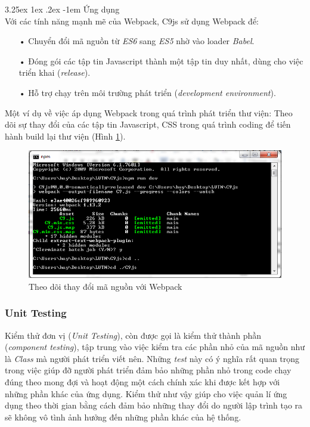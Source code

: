 \documentclass[12pt,a4paper,twoside]{article}
\makeatletter
\newcommand{\myparagraph}[1]{\paragraph{#1}\mbox{}\\} %
\renewcommand\paragraph{\@startsection{paragraph}{5}{\z@}%
  {3.25ex \@plus1ex \@minus.2ex}%
  {-1em}%
  {\normalfont\normalsize\bfseries}}
\makeatother
\begin{document}
\myparagraph{Ứng dụng}
Với các tính năng mạnh mẽ của Webpack, C9js sử dụng Webpack để:
\begin{itemize}
\item[•] Chuyển đổi mã nguồn từ \textit{ES6} sang \textit{ES5} nhờ vào loader \textit{Babel}.
\item[•] Đóng gói các tập tin Javascript thành một tập tin duy nhất, dùng cho việc triển khai (\textit{release}).
\item[•] Hỗ trợ chạy trên môi trường phát triển (\textit{development environment}).
\end{itemize}

Một ví dụ về việc áp dụng Webpack trong quá trình phát triển thư viện: Theo dõi sự thay đổi của các tập tin Javascript, CSS trong quá trình coding để tiến hành build lại thư viện (Hình \ref{fig:webpack_build}).

\begin{figure}[!h]
	\begin{center}
    \includegraphics[scale=.8]{image/webpack_build}
    \caption{Theo dõi thay đổi mã nguồn với Webpack}
    \label{fig:webpack_build}
	\end{center}
\end{figure}

\subsubsection{Unit Testing}
Kiểm thử đơn vị (\textit{Unit Testing}), còn được gọi là kiểm thử thành phần (\textit{component testing}), tập trung vào việc kiểm tra các phần nhỏ của mã nguồn như là \textit{Class} mà người phát triển viết nên. Những \textit{test} này có ý nghĩa rất quan trọng trong việc giúp đỡ người phát triển đảm bảo những phần nhỏ trong code chạy đúng theo mong đợi và hoạt động một cách chính xác khi được kết hợp với những phần khác của ứng dụng. Kiểm thử như vậy giúp cho việc quản lí ứng dụng theo thời gian bằng cách đảm bảo những thay đổi do người lập trình tạo ra sẽ không vô tình ảnh hưởng đến những phần khác của hệ thống.
\end{document}
